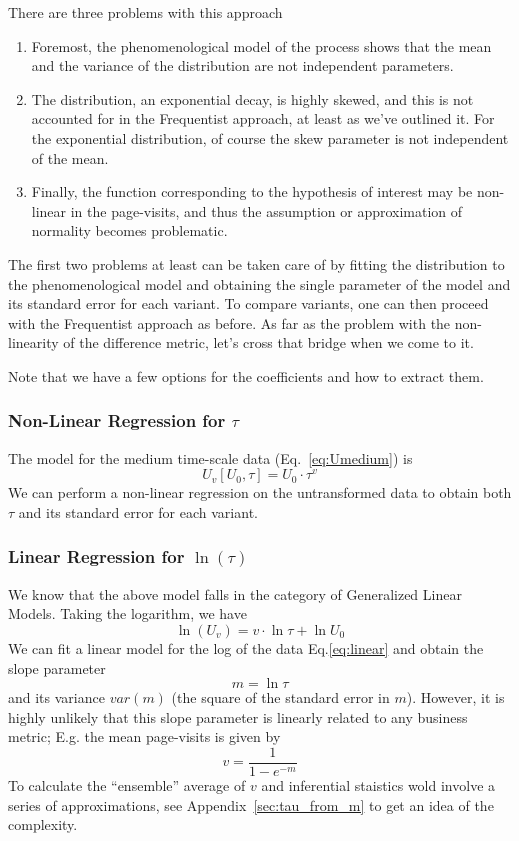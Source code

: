 \documentclass[12pt]{report}
\newcommand{\be}{\begin{enumerate}} %
\newcommand{\ee}{\end{enumerate}} %
\newcommand{\beq}{\begin{equation}} %
\newcommand{\eeq}{\end{equation}} %
\newcommand{\bdm}{\begin{displaymath}} %
\newcommand{\edm}{\end{displaymath}} %
\begin{document}
There are three problems with this approach
\be
\item Foremost, the phenomenological model of the process shows that
  the mean and the variance of the distribution are not independent
  parameters.
\item The distribution, an exponential decay, is highly skewed, and
  this is not accounted for in the Frequentist approach, at least as
  we've outlined it. For the exponential distribution, of course the
  skew parameter is not independent of the mean.
\item Finally, the function corresponding to the hypothesis of
  interest may be non-linear in the page-visits, and thus the
  assumption or approximation of normality becomes problematic.
\ee

The first two problems at least can be taken care of by fitting the
distribution to the phenomenological model and obtaining the single
parameter of the model and its standard error for each variant. To
compare variants, one can then proceed with the Frequentist approach
as before. As far as the problem with the non-linearity of the
difference metric, let's cross that bridge when we come to it.

Note that we have a few options for the coefficients and how to
extract them.

\subsubsection{Non-Linear Regression for \(\tau\)}
The model for the medium time-scale data (Eq.~\ref{eq:Umedium}) is
\beq\label{eq:nl_tau}
U_v[U_0,\tau]=U_0\cdot \tau^v
\eeq
We can perform a non-linear regression on the untransformed data to
obtain both \(\tau\) and its standard error for each variant.

\subsubsection{Linear Regression for \(\ln(\tau)\)}
We know that the above model falls in the category of Generalized
Linear Models. Taking the logarithm, we have
\beq\label{eq:linear}
\ln(U_v) = v\cdot\ln\tau + \ln U_0
\eeq
We can fit a linear model for the log of the data Eq.\ref{eq:linear}
and obtain the slope parameter
\bdm
m=\ln\tau
\edm
and its variance \(var(m)\) (the square of the standard error in
\(m\)). However, it is highly unlikely that this slope parameter is
linearly related to any business metric; E.g. the mean page-visits is
given by
\bdm
v = \frac{1}{1-e^{-m}}
\edm
To calculate the ``ensemble'' average of \(v\) and inferential
staistics wold involve a series of approximations, see
Appendix~\ref{sec:tau_from_m} to get an idea of the complexity.
\end{document}
